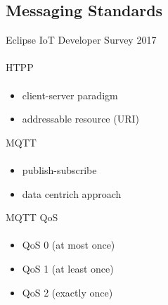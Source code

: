 \documentclass[10pt,aspectratio=\ratio,
compress
]{beamer}
\begin{document}
\subsection{Messaging Standards}
\begin{frame}{Eclipse IoT Developer Survey 2017}\framesubtitle{}
\end{frame}

\begin{frame}{HTPP}\framesubtitle{}
\begin{itemize}
\item client-server paradigm
\item addressable resource (URI)
\end{itemize}
\end{frame}

\begin{frame}{MQTT}\framesubtitle{}
	\begin{itemize}
		\item publish-subscribe
		\item data centrich approach
	\end{itemize}
\end{frame}

\begin{frame}{MQTT QoS}\framesubtitle{}
	\begin{itemize}
		\item QoS 0 (at most once)
		\item QoS 1 (at least once)
		\item QoS 2 (exactly once)
	\end{itemize}
\end{frame}
\end{document}
